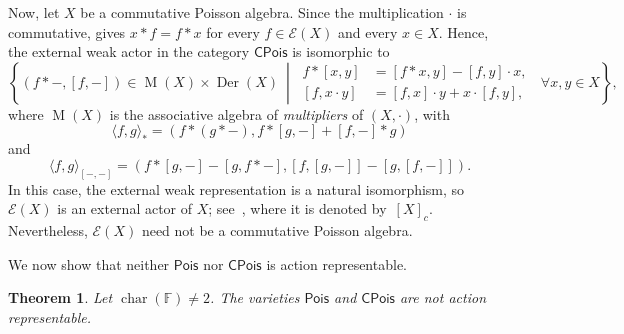 \documentclass[reqno,a4paper]{amsart}
\theoremstyle{plain}
\newtheorem{theorem}[subsection]{Theorem}
\theoremstyle{definition}
\theoremstyle{remark}
\numberwithin{equation}{section}
\newcommand{\F}{\mathbb{F}}
\newcommand{\E}{\mathcal{E}}
\DeclareMathOperator{\bchar}{char}
\DeclareMathOperator{\Der}{Der}
\DeclareMathOperator{\M}{M}
\newcommand{\Pois}{\ensuremath{\mathsf{Pois}}}
\newcommand{\CPois}{\ensuremath{\mathsf{CPois}}}
\begin{document}
Now, let $X$ be a commutative Poisson algebra. Since the multiplication $\cdot$ is commutative,  gives $x\ast f=f\ast x$ for every $f\in\E(X)$ and every $x\in X$. Hence, the external weak actor in the category $\CPois$ is isomorphic to
\[
\left\{
(f \ast -, [f,-])\in\operatorname{M}(X)\times\Der(X)
\ \middle|\
\begin{aligned}
f \ast [x,y]&=[f \ast x,y]-[f,y]\cdot x,\\
[f,x \cdot y]&=[f,x] \cdot y+x \cdot [f,y],
\end{aligned}
\; \; \forall x,y\in X
\right\},
\]
where $\M(X)$ is the associative algebra of \emph{multipliers} of $(X,\cdot)$, with
\[
\langle f,g\rangle_\ast=(f \ast (g \ast -), f \ast [g,-] + [f,-] \ast g)
\]
and
\[
\langle f,g\rangle_{[-,-]}=(f \ast [g,-] - [g,f \ast -], [f,[g,-]]-[g,[f,-]]).
\]
In this case, the external weak representation is a natural isomorphism, so $\E(X)$ is an external actor of $X$; see~\cite[Section~5]{CigoliManciniMetere}, where it is denoted by~$[X]_c$. Nevertheless, $\E(X)$ need not be a commutative Poisson algebra.

We now show that neither $\Pois$ nor $\CPois$ is action representable.

\begin{theorem}\label{TheoremPoisNotAR}
Let $\bchar(\F)\neq2$. The varieties $\Pois$ and $\CPois$ are not action representable.
\end{theorem}
\end{document}
